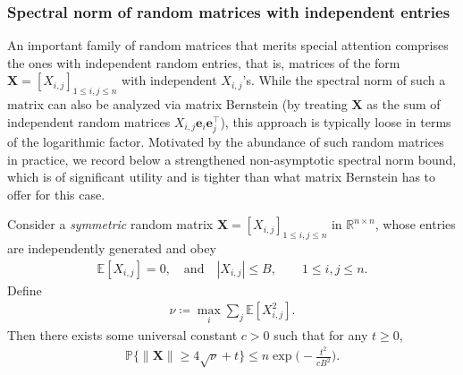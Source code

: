 \subsubsection{Spectral norm of random matrices with independent entries}
An important family of random matrices that merits special attention comprises the ones with independent random entries,
that is, matrices of the form $\bm{X}=[X_{i,j}]_{1\leq i,j\leq n}$ with independent $X_{i,j}$'s.
While the spectral norm of such a matrix can also be analyzed via matrix Bernstein (by treating $\bm{X}$ as the sum of independent random matrices $X_{i,j}\bm{e}_i\bm{e}_j^{\top}$),
this approach is typically loose in terms of the logarithmic factor.
Motivated by the abundance of such random matrices in practice,
we record below a strengthened non-asymptotic spectral norm bound, which is of significant utility and is tighter than what matrix Bernstein has to offer for this case.
%
\begin{theorem}
	\label{thm:tighter-spectral-normal-ramon}
	Consider a \emph{symmetric} random matrix $\bm{X}=[X_{i,j}]_{1\leq i,j\leq n}$ in $\mathbb{R}^{n\times n}$, whose entries are independently generated and obey		%
	\begin{align}
		\label{eq:Xij-condition-iid}
		\mathbb{E}[X_{i,j}]=0, \quad \text{and} \quad  |X_{i,j}|\leq B,  \qquad 1\leq i,j\leq n.
	\end{align}	
	Define
	\begin{align}
		\label{eq:Xij-row-sum-variance}
		\nu \coloneqq \max_i \sum\nolimits_j \mathbb{E}[X_{i,j}^2].
	\end{align}
	Then there exists some universal constant $c>0$ such that for any $t\geq 0$,
	\begin{align} \label{eq3.8}
		\mathbb{P}\Big\{ \|\bm{X}\|\geq4\sqrt{\nu}+t \Big\} \leq n\exp\Big(-\frac{t^{2}}{cB^{2}}\Big).		
	\end{align}
\end{theorem}


